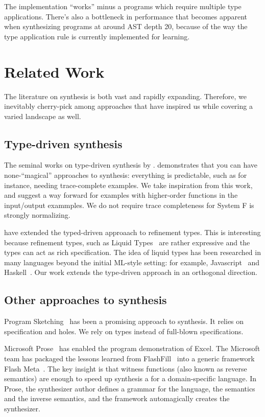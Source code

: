 \documentclass[acmsmall]{acmart}
\theoremstyle{mytheoremstyle}
\begin{document}
The implementation ``works'' minus a programs which require multiple type applications. There's also a bottleneck in performance that becomes apparent when synthesizing programs at around AST depth 20, because of the way the type application rule is currently implemented for learning.

\section{Related Work}

The literature on synthesis is both vast and rapidly expanding. Therefore, we inevitably cherry-pick among approaches that have inspired us while covering a varied landscape as well.

\subsection{Type-driven synthesis}

The seminal works on type-driven synthesis by \citet{osera2015program}. demonstrates that you can have none-``magical'' approaches to synthesis: everything is predictable, such as for instance, needing trace-complete examples. We take inspiration from this work, and suggest a way forward for examples with higher-order functions in the input/output exammples. We do not require trace completeness for System F is strongly normalizing.

\citet{polikarpova2016program} have extended the typed-driven approaach to refinement types. This is interesting because refinement types, such as Liquid Types~\cite{lrondon2012liquid} are rather expressive and the types can act as rich specification. The idea of liquid types has been researched in many languages beyond the initial ML-style setting: for example, Javascript~\cite{chugh2012nested} and Haskell~\cite{liquidhaskell}. Our work extends the type-driven approach in an orthogonal direction.

\subsection{Other approaches to synthesis}

Program Sketching~\cite{solar2008program} has been a promising approach to synthesis. It relies on specification and holes. We rely on types instead of full-blown specifications.

Microsoft Prose~\cite{msprose} has enabled the program demonstration of
Excel. The Microsoft team has packaged the lessons learned from
FlashFill~\cite{gulwani2011automating}  into a generic framework Flash Meta~\cite{flashmeta}. The key
insight is that witness functions (also known as reverse semantics)
are enough to speed up synthesis a for a domain-specific language. In
Prose, the synthesizer author defines a grammar for the language, the
semantics and the inverse semantics, and the framework automagically
creates the synthesizer.
\end{document}
